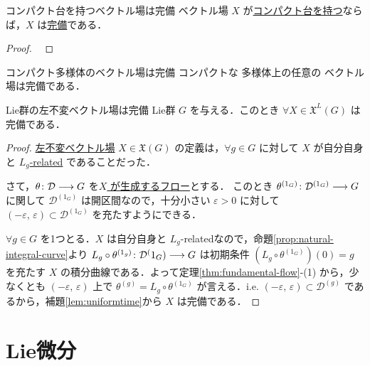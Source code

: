 \documentclass[TQFT_main]{subfiles}
\begin{document}
\begin{mytheo}[label=thm:complete-compace]{コンパクト台を持つベクトル場は完備}
    \cinfty ベクトル場 $X$ が\hyperref[def:vecf]{コンパクト台を持つ}ならば，$X$ は\hyperref[def:complete-vecf]{完備}である．
\end{mytheo}

\begin{proof}
    ~\cite[p.216, Theorem 9.16]{Lee2012smooth}
\end{proof}


\begin{mycol}[label=col:complete-compact]{コンパクト多様体のベクトル場は完備}
    コンパクトな \cinfty 多様体上の任意の \cinfty ベクトル場は完備である．
\end{mycol}


\begin{mytheo}[label=thm:left-invariant-complete]{Lie群の左不変ベクトル場は完備}
    Lie群 $G$ を与える．このとき $\forall X \in \mathfrak{X}^L(G)$ は完備である．
\end{mytheo}

\begin{proof}
    \hyperref[def:left-invariant]{左不変ベクトル場} $X \in \mathfrak{X}(G)$ の定義は，$\forall g \in G$ に対して $X$ が自分自身と \hyperref[def:F-related]{$L_g$-related} であることだった．

    さて，$\theta \colon \mathcal{D} \longrightarrow G$ を\hyperref[thm:fundamental-flow]{$X$ が生成するフロー}とする．
    このとき $\theta^{(1_G)} \colon \mathcal{D}^{(1_G)} \longrightarrow G$ に関して $\mathcal{D}^{(1_G)}$ は開区間なので，十分小さい $\varepsilon > 0$ に対して $(-\varepsilon,\, \varepsilon) \subset \mathcal{D}^{(1_G)}$ を充たすようにできる．

    $\forall g \in G$ を1つとる．$X$ は自分自身と $L_g$-relatedなので，命題\ref{prop:natural-integral-curve}より $L_g \circ \theta^{(1_g)} \colon \mathcal{D}^(1_G) \longrightarrow G$ は初期条件 $(L_g \circ \theta^{(1_G)})(0) = g$ を充たす $X$ の積分曲線である．よって定理\ref{thm:fundamental-flow}-(1) から，少なくとも $(-\varepsilon,\, \varepsilon)$ 上で $\theta^{(g)} = L_g \circ \theta^{(1_G)}$ が言える．i.e. $(-\varepsilon,\, \varepsilon) \subset \mathcal{D}^{(g)}$ であるから，補題\ref{lem:uniformtime}から $X$ は完備である．
\end{proof}

\section{Lie微分}
\end{document}
